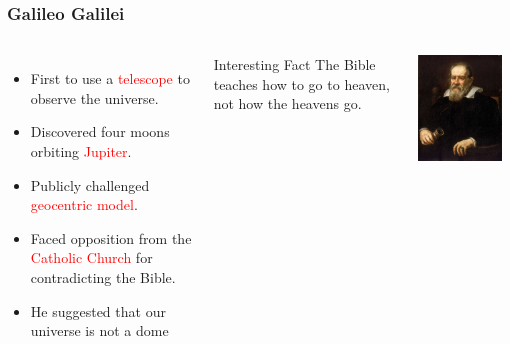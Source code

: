 \documentclass[aspectratio=1611, 9pt]{beamer}
\begin{document}
\begin{frame}
  \frametitle{Galileo Galilei}
  \begin{columns}
    \begin{itemize}
      \item First to use a \textcolor{red}{telescope} to observe the universe.
      \item Discovered four moons orbiting \textcolor{red}{Jupiter}.
      \item Publicly challenged \textcolor{red}{geocentric model}.
      \item Faced opposition from the \textcolor{red}{Catholic Church} for contradicting the Bible.
      \item He suggested that our universe is not a dome
    \end{itemize}

    \begin{block}{Interesting Fact}
      The Bible teaches how to go to heaven, not how the heavens go.
    \end{block}

    \begin{center}
      \includegraphics[width=0.9\textwidth]{pictures/galilei.jpg}
    \end{center}
  \end{columns}
\end{frame}
\end{document}
